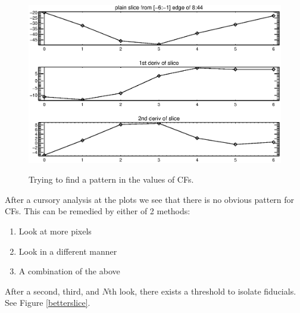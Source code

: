 \documentclass[10pt]{article}
\begin{document}
\begin{figure}[!ht]
{        \includegraphics[width=0.5\linewidth, height = .34\textheight, keepaspectratio=true]{../plots_tables_images/slice6.eps}
        }
        \caption{Trying to find a pattern in the values of CFs.}
        \label{6slices}
\end{figure}

After a cursory analysis at the plots we see that there is no obvious pattern for CFs. This can be remedied by either of 2 methods:

\begin{enumerate}
    \item Look at more pixels
    \item Look in a different manner
    \item A combination of the above
\end{enumerate}

After a second, third, and $N$th look, there exists a threshold to isolate fiducials. See Figure \ref{betterslice}.\\
\end{document}
